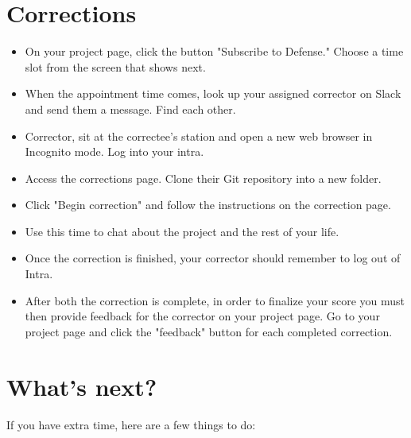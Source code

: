 \documentclass{42-en}
\begin{document}
\chapter{Corrections}
\begin{itemize}
	\item On your project page, click the button "Subscribe to Defense." Choose a time slot from the screen that shows next.

	\item When the appointment time comes, look up your assigned corrector on Slack and send them a message. Find each other.

	\item Corrector, sit at the correctee's station and open a new web browser in Incognito mode. Log into your intra.

	\item Access the corrections page. Clone their Git repository into a new folder.

	\item Click "Begin correction" and follow the instructions on the correction page.

	\item Use this time to chat about the project and the rest of your life.

	\item Once the correction is finished, your corrector should remember to log out of Intra.

	\item After both the correction is complete, in order to finalize your score you must then provide feedback for the corrector on your project page. Go to your project page and click the "feedback" button for each completed correction.

\end{itemize}


\chapter{What's next?}

If you have extra time, here are a few things to do:
\end{document}
